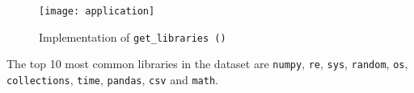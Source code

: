 \begin{figure}[htp]
\texttt{[image: application]}
\caption{Implementation of \texttt{get\_libraries\,()}}\label{img:app}
\end{figure}

The top 10 most common libraries in the dataset are \texttt{numpy}, \texttt{re},
\texttt{sys}, \texttt{random}, \texttt{os}, \texttt{collections}, \texttt{time},
\texttt{pandas}, \texttt{csv} and \texttt{math}.

